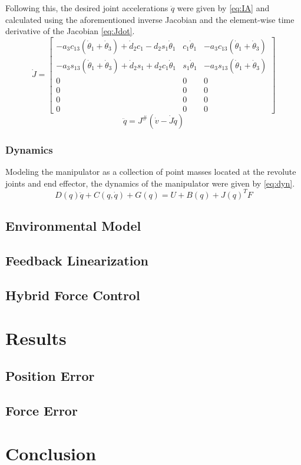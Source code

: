 \documentclass[letterpaper,12pt]{report}
\begin{document}
Following this, the desired joint accelerations $\ddot q$ were given by \eqref{eq:IA} and calculated
using the aforementioned inverse Jacobian and the element-wise time derivative
of the Jacobian \eqref{eq:Jdot}.
\begin{equation} \label{eq:Jdot}
\dot J = 
	\begin{bmatrix}
		-a_3c_{13}(\dot\theta_1+\dot\theta_3)+\dot d_2c_1-d_2s_1\dot\theta_1&c_1\dot\theta_1&-a_3c_{13}(\dot\theta_1+\dot\theta_3)\\
		-a_3s_{13}(\dot\theta_1+\dot\theta_3)+\dot d_2s_1+d_2c_1\dot\theta_1&s_1\dot\theta_1&-a_3s_{13}(\dot\theta_1+\dot\theta_3)\\
		0&0&0\\
		0&0&0\\
		0&0&0\\
		0&0&0
	\end{bmatrix}
\end{equation}
\begin{equation} \label{eq:IA}
\ddot q = J^\#(\dot v - \dot J \dot q)
\end{equation}

\subsection{Dynamics}
Modeling the manipulator as a collection of point masses located at the revolute joints and end effector,
the dynamics of the manipulator were given by \eqref{eq:dyn}.
\begin{equation} \label{eq:dyn}
D(q)\ddot q + C(q,\dot q) + G(q) = U + B(q) + J(q)^TF
\end{equation}

\section{Environmental Model}
\section{Feedback Linearization}
\section{Hybrid Force Control}

\chapter{Results}
\section{Position Error}
\section{Force Error}


\chapter{Conclusion}
\end{document}
